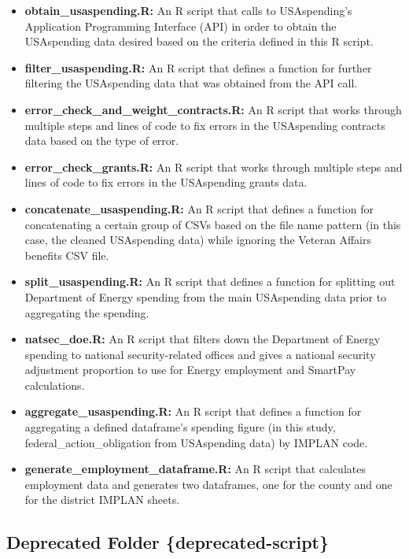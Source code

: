 \documentclass[
]{book}
\providecommand{\tightlist}{%
  \setlength{\itemsep}{0pt}\setlength{\parskip}{0pt}}
\begin{document}
\begin{itemize}
\tightlist
\item
  \textbf{obtain\_usaspending.R:} An R script that calls to USAspending's Application Programming Interface (API) in order to obtain the USAspending data desired based on the criteria defined in this R script.
\item
  \textbf{filter\_usaspending.R:} An R script that defines a function for further filtering the USAspending data that was obtained from the API call.
\item
  \textbf{error\_check\_and\_weight\_contracts.R:} An R script that works through multiple steps and lines of code to fix errors in the USAspending contracts data based on the type of error.
\item
  \textbf{error\_check\_grants.R:} An R script that works through multiple steps and lines of code to fix errors in the USAspending grants data.
\item
  \textbf{concatenate\_usaspending.R:} An R script that defines a function for concatenating a certain group of CSVs based on the file name pattern (in this case, the cleaned USAspending data) while ignoring the Veteran Affairs benefits CSV file.
\item
  \textbf{split\_usaspending.R:} An R script that defines a function for splitting out Department of Energy spending from the main USAspending data prior to aggregating the spending.
\item
  \textbf{natsec\_doe.R:} An R script that filters down the Department of Energy spending to national security-related offices and gives a national security adjustment proportion to use for Energy employment and SmartPay calculations.
\item
  \textbf{aggregate\_usaspending.R:} An R script that defines a function for aggregating a defined dataframe's spending figure (in this study, federal\_action\_obligation from USAspending data) by IMPLAN code.
\item
  \textbf{generate\_employment\_dataframe.R:} An R script that calculates employment data and generates two dataframes, one for the county and one for the district IMPLAN sheets.
\end{itemize}

\hypertarget{deprecated-folder-deprecated-script}{%
\subsection{Deprecated Folder \{deprecated-script\}}\label{deprecated-folder-deprecated-script}}
\end{document}
